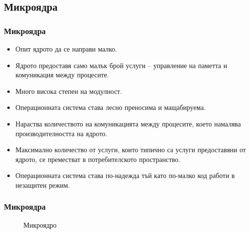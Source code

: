 \documentclass[ignorenonframetext, hyperref=unicode]{beamer}
\begin{document}
\subsection{Микроядра}

\begin{frame}
\frametitle{Микроядра}
\begin{itemize}
\item Опит ядрото да се направи малко.
\item Ядрото предоставя само малък брой услуги -- управление на паметта и
комуникация между процесите.
\item Много висока степен на модулност.
\item Операционната система става лесно преносима и мащабируема.
\item Нараства количеството на комуникацията между процесите, което намалява
производителността на ядрото.
\item Максимално количество от услуги, които типично са услуги предоставяни от
ядрото, се преместват в потребителското пространство.
\item Операционната система става по-надежда тъй като по-малко код работи в
незащитен режим.
\end{itemize}
\end{frame}

\begin{frame}
\frametitle{Микроядра}
\begin{figure}[h]
\center
{}
\caption{Микроядро}
\end{figure}
\end{frame}
\end{document}

